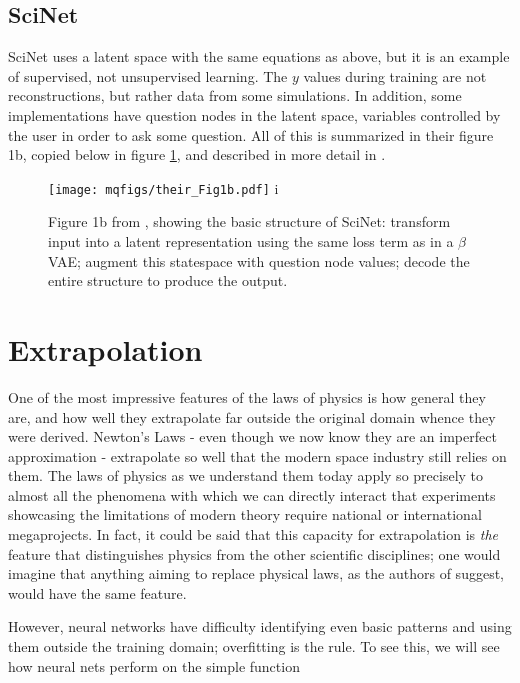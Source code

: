 \documentclass[aps,prl,preprint,groupedaddress]{revtex4-1}
\begin{document}
\subsection{SciNet}

SciNet uses a latent space with the same equations as above, but it is an example of supervised, not unsupervised learning. The $y$ values during training are not reconstructions, but rather data from some simulations. In addition, some implementations have question nodes in the latent space, variables controlled by the user in order to ask some question. All of this is summarized in their figure 1b, copied below in figure \ref{fig1b}, and described in more detail in \cite{iten2020}.

\begin{figure}[h]
   \centering
   \texttt{[image: mqfigs/their\_Fig1b.pdf]}
i   \caption{\label{fig1b} Figure 1b from \cite{iten2020}, showing the basic structure of SciNet: transform input into a latent representation using the same loss term as in a $\beta$VAE; augment this statespace with question node values; decode the entire structure to produce the output.}
\end{figure}

\section{Extrapolation}


One of the most impressive features of the laws of physics is how general they are, and how well they extrapolate far outside the original domain whence they were derived. Newton's Laws - even though we now know they are an imperfect approximation - extrapolate so well that the modern space industry still relies on them. The laws of physics as we understand them today apply so precisely to almost all the phenomena with which we can directly interact that experiments showcasing the limitations of modern theory require national or international megaprojects. In fact, it could be said that this capacity for extrapolation is \emph{the} feature that distinguishes physics from the other scientific disciplines; one would imagine that anything aiming to replace physical laws, as the authors of \cite{iten2020} suggest, would have the same feature.

However, neural networks have difficulty identifying even basic patterns and using them outside the training domain; overfitting is the rule. To see this, we will see how neural nets perform on the simple function
\end{document}
